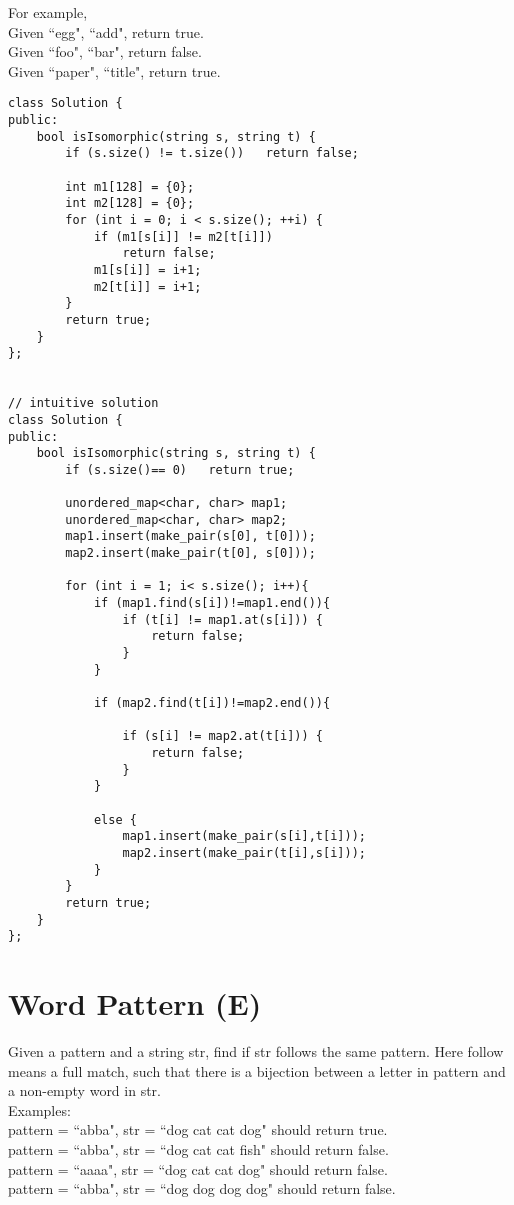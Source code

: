 For example,\\
Given ``egg", ``add", return true.\\
Given ``foo", ``bar", return false.\\
Given ``paper", ``title", return true.\\

\begin{lstlisting}
class Solution {
public:
    bool isIsomorphic(string s, string t) {
        if (s.size() != t.size())   return false;
            
        int m1[128] = {0};
        int m2[128] = {0};
        for (int i = 0; i < s.size(); ++i) {
            if (m1[s[i]] != m2[t[i]])
                return false;
            m1[s[i]] = i+1;
            m2[t[i]] = i+1;
        }
        return true;
    }
};


// intuitive solution  
class Solution {
public:
    bool isIsomorphic(string s, string t) {
        if (s.size()== 0)   return true;
        
        unordered_map<char, char> map1;
        unordered_map<char, char> map2;
        map1.insert(make_pair(s[0], t[0]));
        map2.insert(make_pair(t[0], s[0]));
        
        for (int i = 1; i< s.size(); i++){
            if (map1.find(s[i])!=map1.end()){
                if (t[i] != map1.at(s[i])) {
                    return false;
                }
            }
            
            if (map2.find(t[i])!=map2.end()){
                
                if (s[i] != map2.at(t[i])) {
                    return false;
                }
            }
            
            else {
                map1.insert(make_pair(s[i],t[i]));
                map2.insert(make_pair(t[i],s[i]));
            }
        }
        return true;
    }
};
\end{lstlisting}


\section{Word Pattern (E)}
Given a pattern and a string str, find if str follows the same pattern. Here follow means a full match, such that there is a bijection between a letter in pattern and a non-empty word in str. \\

Examples:\\
    pattern = ``abba", str = ``dog cat cat dog" should return true.\\
    pattern = ``abba", str = ``dog cat cat fish" should return false.\\
    pattern = ``aaaa", str = ``dog cat cat dog" should return false.\\
    pattern = ``abba", str = ``dog dog dog dog" should return false.\\

